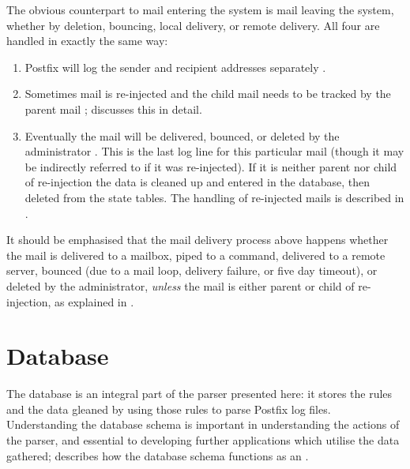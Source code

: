 \label{mail delivery}

The obvious counterpart to mail entering the system is mail leaving the
system, whether by deletion, bouncing, local delivery, or remote delivery.
All four are handled in exactly the same way:

\begin{enumerate}

    \item Postfix will log the sender and recipient addresses separately
        .

    \item Sometimes mail is re-injected and the child mail needs to be
        tracked by the parent mail ;
         discusses this in detail.

    \item Eventually the mail will be delivered, bounced, or deleted by the
        administrator .  This is the last log line
        for this particular mail (though it may be indirectly referred to
        if it was re-injected).  If it is neither parent nor child of
        re-injection the data is cleaned up and entered in the database,
        then deleted from the state tables.  The handling of re-injected
        mails is described in .

\end{enumerate}

It should be emphasised that the mail delivery process above happens
whether the mail is delivered to a mailbox, piped to a command, delivered
to a remote server, bounced (due to a mail loop, delivery failure, or five
day timeout), or deleted by the administrator, \textit{unless\/} the mail
is either parent or child of re-injection, as explained in
.

\section{Database}

\label{database}

The database is an integral part of the parser presented here: it stores
the rules and the data gleaned by using those rules to parse Postfix log
files.  Understanding the database schema is important in understanding the
actions of the parser, and essential to developing further applications
which utilise the data gathered;  describes
how the database schema functions as an .

